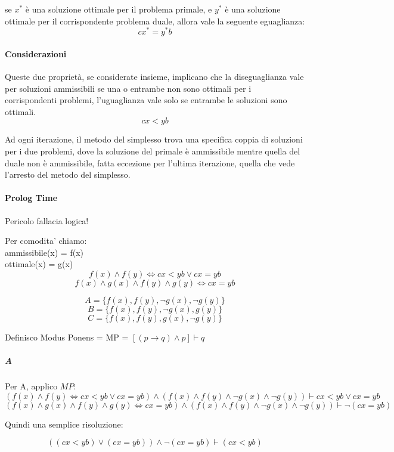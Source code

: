 se $x^*$ è una soluzione ottimale per il problema primale, e $y^*$ è una soluzione ottimale per il corrispondente problema duale, allora vale la seguente eguaglianza:
\[
    cx^* = y^*b
\]

\paragraph{Considerazioni}

Queste due proprietà, se considerate insieme, implicano che la diseguaglianza vale per soluzioni ammissibili se una o entrambe non sono ottimali per i corrispondenti problemi, l’uguaglianza vale solo se entrambe le soluzioni sono ottimali.
\[
    cx < yb
\]

Ad ogni iterazione, il metodo del simplesso trova una specifica coppia di soluzioni per i due problemi, dove la soluzione del primale è ammissibile mentre quella del duale non è ammissibile, fatta eccezione per l’ultima iterazione, quella che vede l’arresto del metodo del simplesso.

\newpage

\paragraph{Prolog Time}
Pericolo fallacia logica!

Per comodita' chiamo: \\
ammissibile(x) = f(x) \\
ottimale(x) = g(x) \\

\[
f(x) \land f(y) \Leftrightarrow cx < yb \lor cx = yb
\]
\[
f(x) \land g(x) \land f(y) \land g(y) \Leftrightarrow cx = yb
\]

\[ A = \{ f(x), f(y), \neg g(x), \neg g(y) \} \]
\[ B = \{ f(x), f(y), \neg g(x), g(y) \} \]
\[ C = \{ f(x), f(y), g(x), \neg g(y) \} \]

Definisco Modus Ponens = MP = $[ (p \rightarrow q) \land p]\vdash q$

\subparagraph{A}

Per A, applico $MP$:
\[
    (f(x) \land f(y) \Leftrightarrow cx < yb \lor cx = yb) \land (f(x) \land f(y) \land \neg g(x) \land \neg g(y)) \vdash cx < yb \lor cx = yb
\]
\[
    (f(x) \land g(x) \land f(y) \land g(y) \Leftrightarrow cx = yb) \land (f(x) \land f(y) \land \neg g(x) \land \neg g(y)) \vdash \neg (cx = yb)
\]

Quindi una semplice risoluzione:

\[
    ((cx < yb) \lor (cx = yb)) \land \neg (cx = yb) \vdash (cx < yb)
\]

